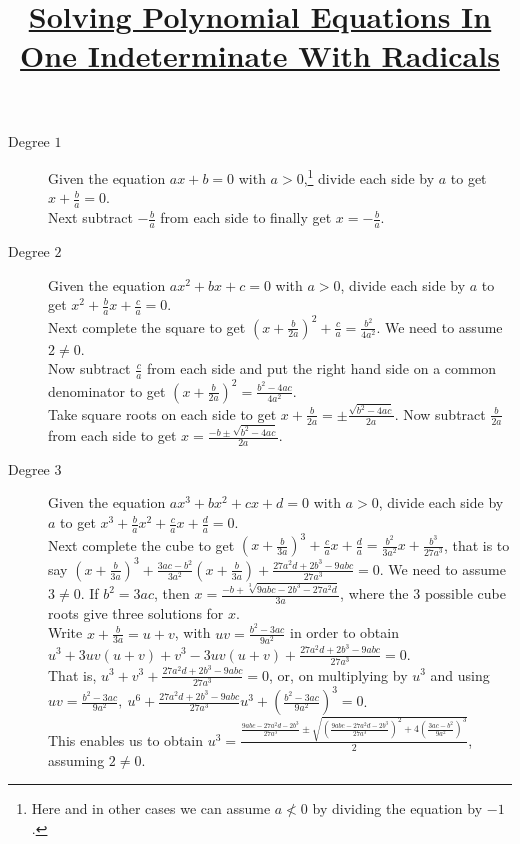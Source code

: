 \documentclass{article}
\title{\hspace*{-8mm}\underline{\bf Solving Polynomial Equations In One 
Indeterminate With Radicals}}
\date{}
\newcommand\linear[2]{-\frac{#2}{#1}}
\newcommand\quadratic[3]{\frac{-#2\pm\sqrt{#2^2-4#1#3}}{2#1}}
\begin{document}
\maketitle
\vspace*{-20mm}
\begin{description}
\item[Degree $1$] Given the equation $ax+b=0$ with $a>0$,\footnote{Here
and in other cases we can assume $a\not<0$ by dividing the equation by
$-1$.} divide each side by $a$ to get $x+\frac ba=0$.\\
Next subtract $-\frac ba$ from each side to finally get $x=\linear
ab$.
\item[Degree $2$] Given the equation $ax^2+bx+c=0$ with $a>0$, divide each
side by $a$ to get $x^2+ \frac bax+\frac ca=0$.\\
Next complete the square to get $\left(x+\frac b{2a}\right)^2+
\frac ca=\frac{b^2}{4a^2}$. We need to assume $2\neq 0$.\\
Now subtract $\frac ca$ from each 
side and put the right hand side on a common denominator to get 
$\left(x+\frac b{2a}\right)^2=\frac{b^2-4ac}{4a^2}$.\\
Take square roots on each side to get $x+\frac b{2a}=\pm\frac{\sqrt{b^2-4ac}}
{2a}$. Now subtract $  \frac b{2a}$ from each side to get 
$x=\quadratic abc$.
\item[Degree $3$] Given the equation $ax^3+bx^2+cx+d=0$ with 
$a>0$, divide each side by $a$ to get $x^3+ \frac bax^2+\frac 
cax+\frac da=0$.\\
Next complete the cube to get $(x+\frac b{3a})^3
+\frac cax+\frac da=\frac{b^2}{3a^2}x+\frac{b^3}{27a^3}$, that is 
to say 
$(x+\frac b{3a})^3+\frac
{3ac-b^2}{3a^2}(x+\frac b{3a})+\frac{27a^2d+2b^3-9abc}{27a^3}=0$. 
We need to assume $3\neq 0$. If
$b^2=3ac$, then $x=\frac{-b+\sqrt[3]{9abc-2b^3-27a^2d}}{3a}$, where the
$3$ possible cube roots give three solutions for $x$.\\
Write $x+\frac b{3a}=u+v$, with $uv=\frac {b^2-3ac}{9a^2}$ in 
order to obtain $u^3+3uv(u+v)+v^3-3uv(u+v)+\frac{27a^2d+2b^3-9abc}
{27a^3}=0$.\\
That is, $u^3+v^3+\frac{27a^2d+2b^3-9abc}{27a^3}=0$, or, on multiplying by $u^3$ and using $uv=\frac {b^2-3ac}{9a^2},\ 
u^6+\frac{27a^2d+2b^3-9abc}{27a^3}u^3+\left(\frac {b^2-3ac}{9a^2}
\right)^3=0$.\\
This enables us to obtain $u^3=\frac{\frac{9abc-27
a^2d-2b^3}{27a^3}\pm\sqrt{\left(\frac{9abc-27a^2d-2b^3}{27a^3}
\right)^2+4\left(\frac{3ac-b^2}{9a^2}\right)^3}}2$, assuming $2\neq 0$.\\

\end{description}
\end{document}
